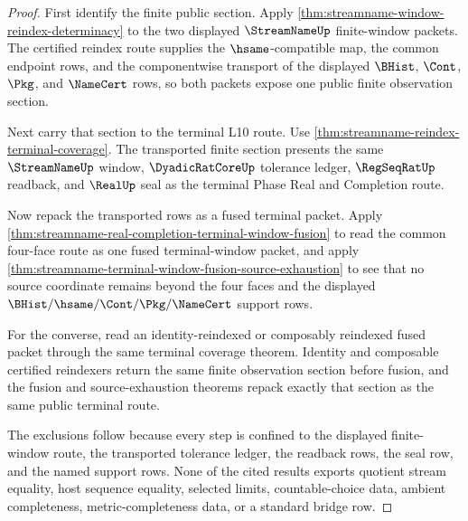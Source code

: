 \begin{proof}
First identify the finite public section. Apply
\autoref{thm:streamname-window-reindex-determinacy} to the two displayed
$\StreamNameUp$ finite-window packets. The certified reindex route supplies the
$\hsame$-compatible map, the common endpoint rows, and the componentwise
transport of the displayed $\BHist$, $\Cont$, $\Pkg$, and $\NameCert$ rows, so
both packets expose one public finite observation section.

Next carry that section to the terminal L10 route. Use
\autoref{thm:streamname-reindex-terminal-coverage}. The transported finite
section presents the same $\StreamNameUp$ window, $\DyadicRatCoreUp$ tolerance
ledger, $\RegSeqRatUp$ readback, and $\RealUp$ seal as the terminal Phase Real
and Completion route.

Now repack the transported rows as a fused terminal packet. Apply
\autoref{thm:streamname-real-completion-terminal-window-fusion} to read the
common four-face route as one fused terminal-window packet, and apply
\autoref{thm:streamname-terminal-window-fusion-source-exhaustion} to see that
no source coordinate remains beyond the four faces and the displayed
$\BHist/\hsame/\Cont/\Pkg/\NameCert$ support rows.

For the converse, read an identity-reindexed or composably reindexed fused
packet through the same terminal coverage theorem. Identity and composable
certified reindexers return the same finite observation section before fusion,
and the fusion and source-exhaustion theorems repack exactly that section as
the same public terminal route.

The exclusions follow because every step is confined to the displayed
finite-window route, the transported tolerance ledger, the readback rows, the
seal row, and the named support rows. None of the cited results exports
quotient stream equality, host sequence equality, selected limits,
countable-choice data, ambient completeness, metric-completeness data, or a
standard bridge row.
\end{proof}

